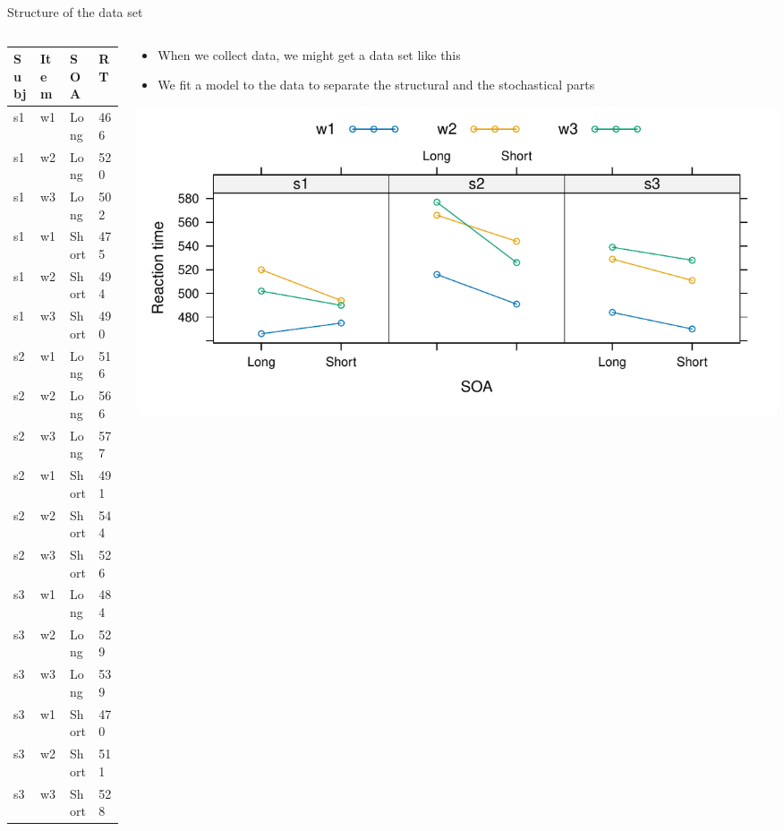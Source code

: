 \documentclass[aspectratio=169]{beamer}
\begin{document}
\begin{frame}{Structure of the data set}
  \begin{columns}
    \begin{column}{.4\textwidth}
      \centering
  \scriptsize
  \begin{tabular}{llll}
    \hline
    Subj & Item & SOA & RT  \\
    \hline
    s1 & w1 & Long  & 466 \\
    s1 & w2 & Long  & 520 \\
    s1 & w3 & Long  & 502 \\
    s1 & w1 & Short & 475 \\
    s1 & w2 & Short & 494 \\
    s1 & w3 & Short & 490 \\
    s2 & w1 & Long  & 516 \\
    s2 & w2 & Long  & 566 \\
    s2 & w3 & Long  & 577 \\
    s2 & w1 & Short & 491 \\
    s2 & w2 & Short & 544 \\
    s2 & w3 & Short & 526 \\
    s3 & w1 & Long  & 484 \\
    s3 & w2 & Long  & 529 \\
    s3 & w3 & Long  & 539 \\
    s3 & w1 & Short & 470 \\
    s3 & w2 & Short & 511 \\
    s3 & w3 & Short & 528 \\
    \hline
  \end{tabular}
    \end{column}
    \begin{column}{.6\textwidth}
      \begin{itemize}
        \item When we collect data, we might get a data set like this
        \item We fit a model to the data to separate the structural and the
          stochastical parts
      \end{itemize}
\includegraphics[scale=.5]{../figures/baayen_ex}
    \end{column}
  \end{columns}
\end{frame}
\end{document}
